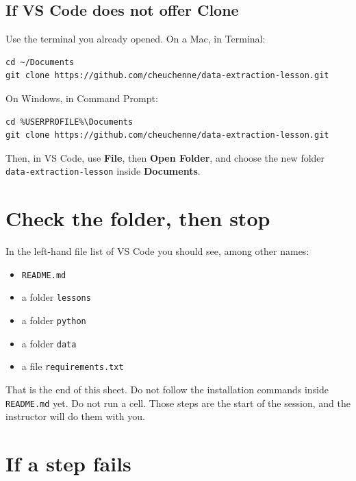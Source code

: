 \documentclass[11pt,a4paper]{article}
\newcommand{\menu}[1]{\textbf{#1}}
\newcommand{\file}[1]{\texttt{#1}}
\begin{document}
\subsection{If VS Code does not offer Clone}

Use the terminal you already opened. On a Mac, in Terminal:

\begin{verbatim}
cd ~/Documents
git clone https://github.com/cheuchenne/data-extraction-lesson.git
\end{verbatim}

On Windows, in Command Prompt:

\begin{verbatim}
cd %USERPROFILE%\Documents
git clone https://github.com/cheuchenne/data-extraction-lesson.git
\end{verbatim}

Then, in VS Code, use \menu{File}, then \menu{Open Folder}, and choose the new folder \file{data-extraction-lesson} inside \menu{Documents}.

\section{Check the folder, then stop}

In the left-hand file list of VS Code you should see, among other names:

\begin{itemize}
\item \file{README.md}
\item a folder \file{lessons}
\item a folder \file{python}
\item a folder \file{data}
\item a file \file{requirements.txt}
\end{itemize}

That is the end of this sheet. Do not follow the installation commands inside \file{README.md} yet. Do not run a cell. Those steps are the start of the session, and the instructor will do them with you.

\section{If a step fails}
\end{document}
